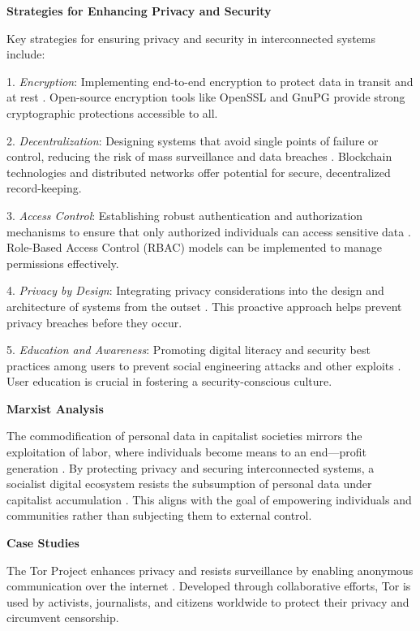 \begin{refsection}
\textbf{Strategies for Enhancing Privacy and Security}

Key strategies for ensuring privacy and security in interconnected systems include:

1. \textit{Encryption}: Implementing end-to-end encryption to protect data in transit and at rest \cite[pp.~110-112]{Ferguson2015}. Open-source encryption tools like OpenSSL and GnuPG provide strong cryptographic protections accessible to all.

2. \textit{Decentralization}: Designing systems that avoid single points of failure or control, reducing the risk of mass surveillance and data breaches \cite[pp.~70-72]{Antonopoulos2014}. Blockchain technologies and distributed networks offer potential for secure, decentralized record-keeping.

3. \textit{Access Control}: Establishing robust authentication and authorization mechanisms to ensure that only authorized individuals can access sensitive data \cite[pp.~38-40]{Sandhu1996}. Role-Based Access Control (RBAC) models can be implemented to manage permissions effectively.

4. \textit{Privacy by Design}: Integrating privacy considerations into the design and architecture of systems from the outset \cite[pp.~25-27]{Cavoukian2010}. This proactive approach helps prevent privacy breaches before they occur.

5. \textit{Education and Awareness}: Promoting digital literacy and security best practices among users to prevent social engineering attacks and other exploits \cite[pp.~156-158]{SANS2020}. User education is crucial in fostering a security-conscious culture.

\textbf{Marxist Analysis}

The commodification of personal data in capitalist societies mirrors the exploitation of labor, where individuals become means to an end—profit generation \cite[pp.~71-72]{Marx1867}. By protecting privacy and securing interconnected systems, a socialist digital ecosystem resists the subsumption of personal data under capitalist accumulation \cite[pp.~172-173]{Marx1867}. This aligns with the goal of empowering individuals and communities rather than subjecting them to external control.

\textbf{Case Studies}

The Tor Project enhances privacy and resists surveillance by enabling anonymous communication over the internet \cite[pp.~15-17]{Dingledine2004}. Developed through collaborative efforts, Tor is used by activists, journalists, and citizens worldwide to protect their privacy and circumvent censorship.


\end{refsection}
